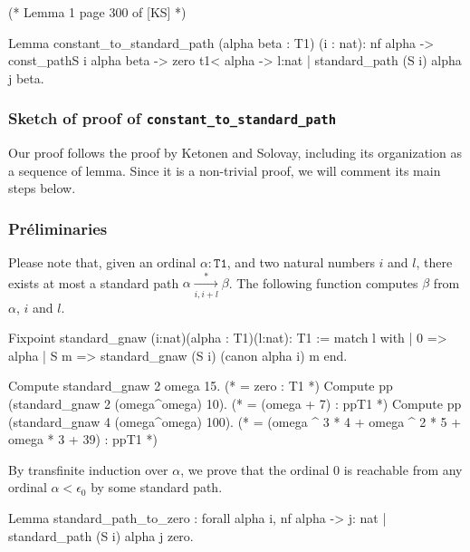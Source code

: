 \documentclass[a4paper]{book}
\begin{document}
\begin{Coqsrc}
(* Lemma 1 page 300 of [KS] *)

Lemma constant_to_standard_path 
  (alpha beta : T1) (i : nat):
  nf alpha -> const_pathS i alpha beta -> zero  t1< alpha ->
  {l:nat | standard_path (S i) alpha j beta}.
\end{Coqsrc}

 

\subsubsection{Sketch of proof of \texttt{constant\_to\_standard\_path}}

Our proof follows the proof by Ketonen and Solovay, including its organization as a sequence of lemma.  Since it is a non-trivial proof, we will comment its main steps below.

\subsubsection*{Préliminaries}


Please note that, given an ordinal $\alpha:\texttt{T1}$, and two natural numbers $i$ and $l$, there exists at most a standard path $\alpha \xrightarrow [i,i+l]{*} \beta$.
The following function computes $\beta$ from $\alpha$, $i$ and $l$.

\begin{Coqsrc}
Fixpoint standard_gnaw (i:nat)(alpha : T1)(l:nat):  T1  :=
  match l with
  | 0 => alpha
  | S m => standard_gnaw (S i) (canon alpha i) m
  end.
\end{Coqsrc}

\begin{Coqsrc}
  Compute standard_gnaw 2 omega 15.
(*   = zero
     : T1 *)
Compute pp (standard_gnaw 2 (omega^omega)  10).
(*
= (omega + 7)%
     : ppT1
*)
Compute pp (standard_gnaw 4 (omega^omega)  100).
(*
 = (omega ^ 3 * 4 + omega ^ 2 * 5 + omega * 3 + 39)%
     : ppT1 *)
\end{Coqsrc}


By transfinite induction over  $\alpha$, we prove that the ordinal $0$ is reachable from any ordinal $\alpha<\epsilon_0$ by some standard path.


\begin{Coqsrc}
Lemma standard_path_to_zero :
  forall  alpha i, nf alpha ->
                   {j: nat | standard_path (S i) alpha j zero}.
\end{Coqsrc}
\end{document}
